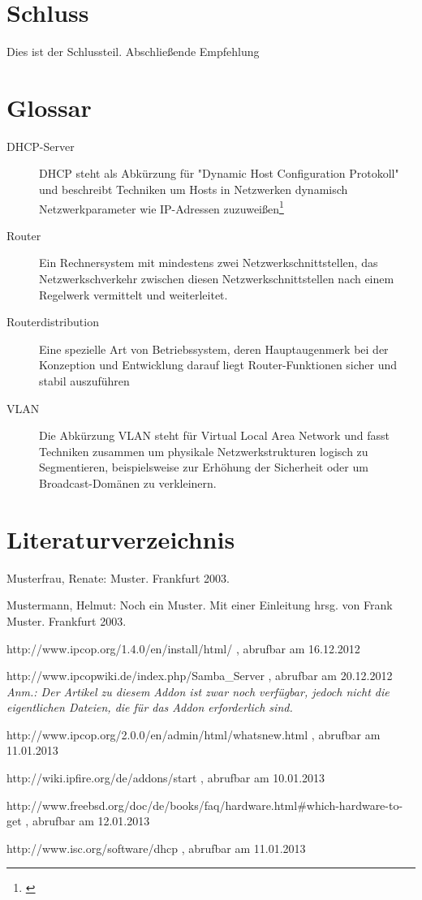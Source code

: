 \documentclass[a4paper,12pt]{scrartcl}
\begin{document}
\section{Schluss}
Dies ist der Schlussteil. Abschlie\ss{}ende Empfehlung
\clearpage

\section{Glossar}
\begin{description}
 \item[DHCP-Server] DHCP steht als Abk\"urzung f\"ur "Dynamic Host
Configuration Protokoll" und beschreibt Techniken um Hosts in Netzwerken
dynamisch Netzwerkparameter wie IP-Adressen zuzuwei\ss{}en\footnote{\cite{dhcp}}
 \item[Router] Ein Rechnersystem mit mindestens zwei Netzwerkschnittstellen,
das Netzwerkschverkehr zwischen diesen Netzwerkschnittstellen nach einem
Regelwerk vermittelt und weiterleitet.
 \item[Routerdistribution] Eine spezielle Art von Betriebssystem, deren
Hauptaugenmerk bei der Konzeption und Entwicklung darauf liegt
Router-Funktionen sicher und stabil auszuf\"uhren
 \item[VLAN] Die Abk\"urzung VLAN steht f\"ur Virtual Local Area Network und
fasst Techniken zusammen um physikale Netzwerkstrukturen logisch zu
Segmentieren, beispielsweise zur Erh\"ohung der Sicherheit oder um
Broadcast-Dom\"anen zu verkleinern.
\end{description}
\clearpage

\section{Literaturverzeichnis}

Musterfrau, Renate: Muster. Frankfurt 2003.


Mustermann, Helmut: Noch ein Muster. Mit einer Einleitung hrsg. von Frank Muster. Frankfurt 2003.

\begin{thebibliography}{99}

 http://www.ipcop.org/1.4.0/en/install/html/ , abrufbar am
16.12.2012

 http://www.ipcopwiki.de/index.php/Samba\_Server ,
abrufbar am 20.12.2012\\
\textit{Anm.: Der Artikel zu diesem Addon ist zwar noch verf\"ugbar, jedoch
nicht die eigentlichen Dateien, die f\"ur das Addon erforderlich sind.}

http://www.ipcop.org/2.0.0/en/admin/html/whatsnew.html , abrufbar am 11.01.2013

 http://wiki.ipfire.org/de/addons/start , abrufbar am
10.01.2013

http://www.freebsd.org/doc/de/books/faq/hardware.html\#which-hardware-to-get ,
abrufbar am 12.01.2013

 http://www.isc.org/software/dhcp , abrufbar am 11.01.2013

\end{thebibliography}
\end{document}
